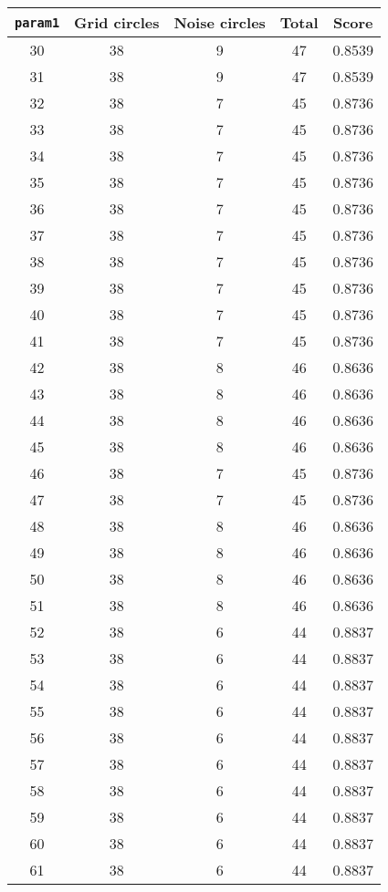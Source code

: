 \documentclass[letterpaper, 12pt]{article}
\begin{document}
\begin{longtable}{|c|c|c|c|c|}
\hline
\textbf{\texttt{param1}} & \textbf{Grid circles} & \textbf{Noise circles} & \textbf{Total} & \textbf{Score} \\
\hline
30 & 38 & 9 & 47 & 0.8539 \\
\hline
31 & 38 & 9 & 47 & 0.8539 \\
\hline
32 & 38 & 7 & 45 & 0.8736 \\
\hline
33 & 38 & 7 & 45 & 0.8736 \\
\hline
34 & 38 & 7 & 45 & 0.8736 \\
\hline
35 & 38 & 7 & 45 & 0.8736 \\
\hline
36 & 38 & 7 & 45 & 0.8736 \\
\hline
37 & 38 & 7 & 45 & 0.8736 \\
\hline
38 & 38 & 7 & 45 & 0.8736 \\
\hline
39 & 38 & 7 & 45 & 0.8736 \\
\hline
40 & 38 & 7 & 45 & 0.8736 \\
\hline
41 & 38 & 7 & 45 & 0.8736 \\
\hline
42 & 38 & 8 & 46 & 0.8636 \\
\hline
43 & 38 & 8 & 46 & 0.8636 \\
\hline
44 & 38 & 8 & 46 & 0.8636 \\
\hline
45 & 38 & 8 & 46 & 0.8636 \\
\hline
46 & 38 & 7 & 45 & 0.8736 \\
\hline
47 & 38 & 7 & 45 & 0.8736 \\
\hline
48 & 38 & 8 & 46 & 0.8636 \\
\hline
49 & 38 & 8 & 46 & 0.8636 \\
\hline
50 & 38 & 8 & 46 & 0.8636 \\
\hline
51 & 38 & 8 & 46 & 0.8636 \\
\hline
52 & 38 & 6 & 44 & 0.8837 \\
\hline
53 & 38 & 6 & 44 & 0.8837 \\
\hline
54 & 38 & 6 & 44 & 0.8837 \\
\hline
55 & 38 & 6 & 44 & 0.8837 \\
\hline
56 & 38 & 6 & 44 & 0.8837 \\
\hline
57 & 38 & 6 & 44 & 0.8837 \\
\hline
58 & 38 & 6 & 44 & 0.8837 \\
\hline
59 & 38 & 6 & 44 & 0.8837 \\
\hline
60 & 38 & 6 & 44 & 0.8837 \\
\hline
61 & 38 & 6 & 44 & 0.8837 \\

\end{longtable}
\end{document}
